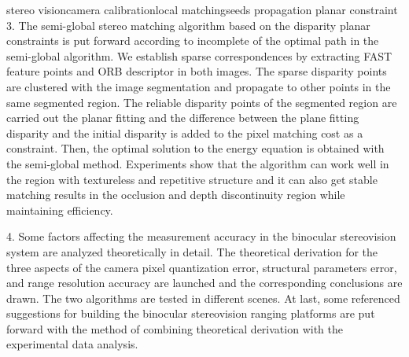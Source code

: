 \begin{Eabstract}{stereo vision}{camera  calibration}{local  matching}{seeds  propagation}{
planar constraint}
3.  The  semi-global  stereo  matching  algorithm  based  on  the  disparity  planar 
constraints  is  put  forward  according  to  incomplete  of  the  optimal  path  in  the 
semi-global  algorithm.  We  establish  sparse  correspondences  by  extracting  FAST 
feature  points  and  ORB  descriptor  in  both  images.  The  sparse  disparity  points  are 
clustered  with  the  image  segmentation  and  propagate  to  other  points  in  the  same 
segmented  region.  The  reliable  disparity  points  of  the  segmented  region  are  carried 
out  the  planar  fitting  and  the  difference  between  the  plane  fitting  disparity  and  the 
initial disparity is added to the pixel matching cost as a constraint. Then, the optimal 
solution to the energy equation is obtained with the semi-global method. Experiments 
show  that  the  algorithm  can  work  well  in  the  region  with  textureless  and  repetitive 
structure  and  it  can  also  get  stable  matching  results  in  the  occlusion  and  depth 
discontinuity region while maintaining efficiency. 

4.  Some  factors  affecting  the  measurement  accuracy  in  the  binocular 
stereovision system are analyzed theoretically in detail. The theoretical derivation for 
the  three  aspects  of  the  camera  pixel  quantization  error,  structural  parameters  error, 
and  range  resolution  accuracy  are  launched  and  the  corresponding  conclusions  are 
drawn.  The  two  algorithms  are  tested  in  different  scenes.  At  last,  some  referenced 
suggestions for building the binocular stereovision ranging platforms are put forward 
with  the  method  of  combining  theoretical  derivation  with  the  experimental  data 
analysis. 
\end{Eabstract}
